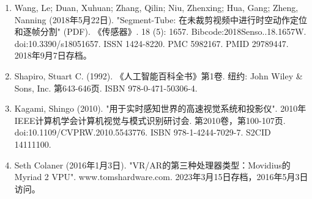 \begin{enumerate}
\item Wang, Le; Duan, Xuhuan; Zhang, Qilin; Niu, Zhenxing; Hua, Gang; Zheng, Nanning (2018年5月22日). "Segment-Tube: 在未裁剪视频中进行时空动作定位和逐帧分割" (PDF). 《传感器》. 18 (5): 1657. Bibcode:2018Senso..18.1657W. doi:10.3390/s18051657. ISSN 1424-8220. PMC 5982167. PMID 29789447. 2018年9月7日存档。
\item Shapiro, Stuart C. (1992). 《人工智能百科全书》第1卷. 纽约: John Wiley & Sons, Inc. 第643-646页. ISBN 978-0-471-50306-4.
\item Kagami, Shingo (2010). "用于实时感知世界的高速视觉系统和投影仪". 2010年IEEE计算机学会计算机视觉与模式识别研讨会. 第2010卷，第100-107页. doi:10.1109/CVPRW.2010.5543776. ISBN 978-1-4244-7029-7. S2CID 14111100.
\item Seth Colaner (2016年1月3日). "VR/AR的第三种处理器类型：Movidius的Myriad 2 VPU". www.tomshardware.com. 2023年3月15日存档，2016年5月3日访问。
\end{enumerate}
